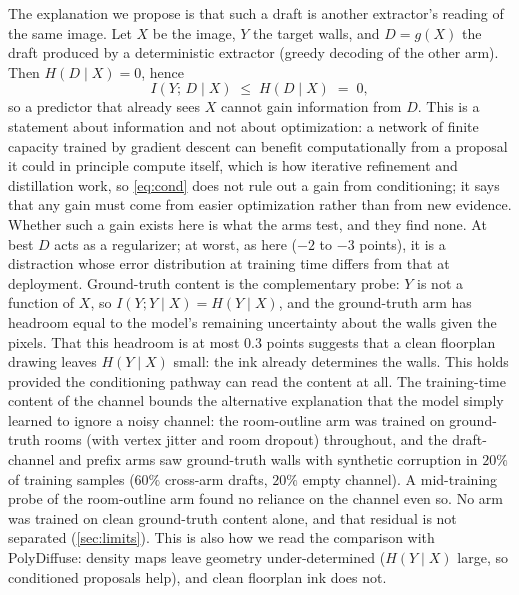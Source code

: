 \documentclass{article}
\begin{document}
The explanation we propose is that such a draft is another extractor's reading
of the same image. Let $X$ be the image, $Y$ the target walls, and $D=g(X)$ the
draft produced by a deterministic extractor (greedy decoding of the other arm).
Then $H(D\mid X)=0$, hence
\begin{equation}
  I(Y;\,D\mid X)\;\le\;H(D\mid X)\;=\;0,
  \label{eq:cond}
\end{equation}
so a predictor that already sees $X$ cannot gain information from $D$. This is
a statement about information and not about optimization: a network of finite
capacity trained by gradient descent can benefit computationally from a
proposal it could in principle compute itself, which is how iterative
refinement and distillation work, so \cref{eq:cond} does not rule out a gain
from conditioning; it says that any gain must come from easier optimization
rather than from new evidence. Whether such a gain exists here is what the
arms test, and they find none. At best
$D$ acts as a regularizer; at worst, as here ($-2$ to $-3$ points), it is a
distraction whose error distribution at training time differs from that at
deployment. Ground-truth content is the complementary probe: $Y$ is not a
function of $X$, so $I(Y;Y\mid X)=H(Y\mid X)$, and the ground-truth arm has
headroom equal to the model's remaining uncertainty about the walls given the
pixels. That this headroom is at most $0.3$ points suggests that a clean
floorplan drawing leaves $H(Y\mid X)$ small: the ink already determines the
walls. This holds provided the conditioning pathway can read the content at
all. The training-time content of the channel bounds the alternative explanation
that the model simply learned to ignore a noisy channel: the room-outline arm
was trained on ground-truth rooms (with vertex jitter and room dropout)
throughout, and the draft-channel and prefix arms saw ground-truth walls with
synthetic corruption in $20\%$ of training samples ($60\%$ cross-arm drafts,
$20\%$ empty channel). A mid-training probe of the room-outline arm found no
reliance on the channel even so. No arm was trained on clean ground-truth
content alone, and that residual is not separated (\cref{sec:limits}). This is also how we read
the comparison with PolyDiffuse: density maps leave geometry under-determined
($H(Y\mid X)$ large, so conditioned proposals help), and clean floorplan ink
does not.
\end{document}
